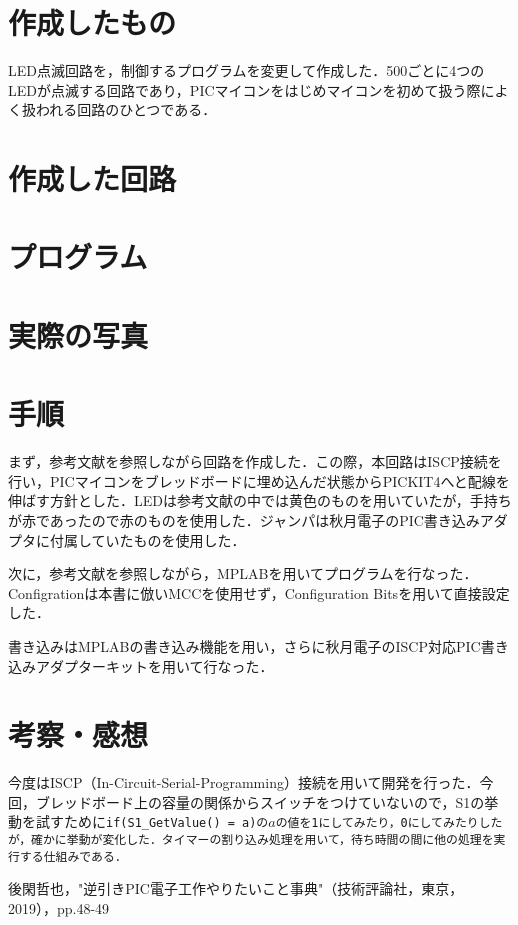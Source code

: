 \documentclass[a4paper, 9pt]{jsarticle}
\title{\sf{Activity Report 01}}
\author{\sf{回路班　首藤　朗}}
\date{\sf{\today}}
\begin{document}
\maketitle
\section{作成したもの}
LED点滅回路を，制御するプログラムを変更して作成した．500ごとに4つのLEDが点滅する回路であり，PICマイコンをはじめマイコンを初めて扱う際によく扱われる回路のひとつである．
\section{作成した回路}
\newpage
\section{プログラム}

\section{実際の写真}

\section{手順}
まず，参考文献\cite{PIC}を参照しながら回路を作成した．この際，本回路はISCP接続を行い，PICマイコンをブレッドボードに埋め込んだ状態からPICKIT4へと配線を伸ばす方針とした．LEDは参考文献\cite{PIC}の中では黄色のものを用いていたが，手持ちが赤であったので赤のものを使用した．ジャンパは秋月電子のPIC書き込みアダプタに付属していたものを使用した．\par
次に，参考文献\cite{PIC}を参照しながら，MPLABを用いてプログラムを行なった．Configrationは本書に倣いMCCを使用せず，Configuration Bitsを用いて直接設定した．\par
書き込みはMPLABの書き込み機能を用い，さらに秋月電子のISCP対応PIC書き込みアダプターキットを用いて行なった．
\section{考察・感想}
今度はISCP（In-Circuit-Serial-Programming）接続を用いて開発を行った．今回，ブレッドボード上の容量の関係からスイッチをつけていないので，S1の挙動を試すために\tt{if(S1\_GetValue() = a)}の$a$の値を1にしてみたり，0にしてみたりしたが，確かに挙動が変化した．タイマーの割り込み処理を用いて，待ち時間の間に他の処理を実行する仕組みである．



\begin{thebibliography}{99}
	 後閑哲也，"逆引きPIC電子工作やりたいこと事典"（技術評論社，東京，2019），pp.48-49
\end{thebibliography}
\end{document}
